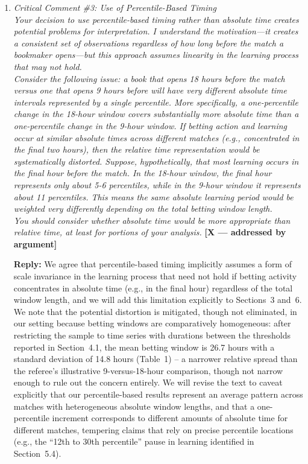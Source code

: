 \documentclass[letterpaper,12pt]{article}
\newcounter{b}
\newcommand{\argX}{\textcolor{green!55!black}{\textbf{[X --- addressed by argument]}}}
\newcommand{\Reply}[1]{\par\noindent\textbf{Reply:} #1}
\begin{document}
\begin{enumerate}
\item \textit{Critical Comment \#3: Use of Percentile-Based Timing\\[6pt]
Your decision to use percentile-based timing rather than absolute time creates potential problems for interpretation. I understand the motivation—it creates a consistent set of observations regardless of how long before the match a bookmaker opens—but this approach assumes linearity in the learning process that may not hold.\\[6pt]
Consider the following issue: a book that opens 18 hours before the match versus one that opens 9 hours before will have very different absolute time intervals represented by a single percentile. More specifically, a one-percentile change in the 18-hour window covers substantially more absolute time than a one-percentile change in the 9-hour window. If betting action and learning occur at similar absolute times across different matches (e.g., concentrated in the final two hours), then the relative time representation would be systematically distorted. Suppose, hypothetically, that most learning occurs in the final hour before the match. In the 18-hour window, the final hour represents only about 5-6 percentiles, while in the 9-hour window it represents about 11 percentiles. This means the same absolute learning period would be weighted very differently depending on the total betting window length.\\[6pt]
You should consider whether absolute time would be more appropriate than relative time, at least for portions of your analysis.} \argX

\Reply{We agree that percentile-based timing implicitly assumes a form of scale invariance in the learning process that need not hold if betting activity concentrates in absolute time (e.g., in the final hour) regardless of the total window length, and we will add this limitation explicitly to Sections~3 and~6. We note that the potential distortion is mitigated, though not eliminated, in our setting because betting windows are comparatively homogeneous: after restricting the sample to time series with durations between the thresholds reported in Section~4.1, the mean betting window is 26.7 hours with a standard deviation of 14.8 hours (Table~1) -- a narrower relative spread than the referee's illustrative 9-versus-18-hour comparison, though not narrow enough to rule out the concern entirely. We will revise the text to caveat explicitly that our percentile-based results represent an average pattern across matches with heterogeneous absolute window lengths, and that a one-percentile increment corresponds to different amounts of absolute time for different matches, tempering claims that rely on precise percentile locations (e.g., the ``12th to 30th percentile'' pause in learning identified in Section~5.4).}


\end{enumerate}
\end{document}
